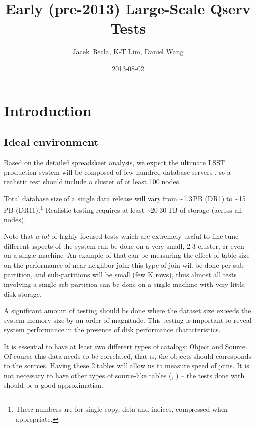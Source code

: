 \documentclass[DM,toc]{lsstdoc}
\title[Early Qserv Tests]{Early (pre-2013) Large-Scale Qserv Tests}
\author{Jacek~Becla, K-T Lim, Daniel Wang}
\date{2013-08-02}
\begin{document}
\maketitle

\section{Introduction}\label{introduction-1}

\subsection{Ideal environment}\label{ideal-environment}

Based on the detailed spreadsheet analysis, we expect the ultimate LSST
production system will be composed of few hundred database servers
, so a realistic test should include a cluster of at
least 100 nodes.

Total database size of a single data release will vary from
\textasciitilde{}1.3\,PB (DR1) to \textasciitilde{}15\,PB
(DR11).\footnote{These numbers are for single copy, data and indices,
  compressed when appropriate.} Realistic testing requires at least
\textasciitilde{}20-30\,TB of storage (across all nodes).

Note that \emph{a lot} of highly focused tests which are extremely
useful to fine tune different aspects of the system can be done on a
very small, 2-3 cluster, or even on a single machine. An example of that
can be measuring the effect of table size on the performance of
near-neighbor join: this type of join will be done per sub-partition,
and sub-partitions will be small (few K rows), thus almost all tests
involving a single sub-partition can be done on a single machine with
very little disk storage.

A significant amount of testing should be done where the dataset size
exceeds the system memory size by an order of magnitude. This testing is
important to reveal system performance in the presence of disk
performance characteristics.

It is essential to have at least two different types of catalogs: Object
and Source. Of course this data needs to be correlated, that is, the
objects should corresponds to the sources. Having these 2 tables will
allow us to measure speed of joins. It is not necessary to have other
types of source-like tables (\DIASource, \ForcedSource) -- the tests done
with \Source should be a good approximation.
\end{document}
